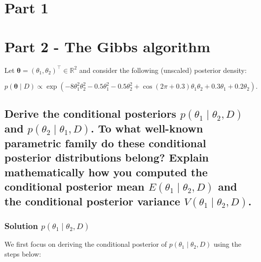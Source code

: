 \documentclass[12pt]{article}
\begin{document}
\section{Part 1}

\section{Part 2 - The Gibbs algorithm}
Let \(\boldsymbol{\theta} = (\theta_1, \theta_2)^\top \in \mathbb{R}^2\) and consider the following (unscaled) posterior density:

\[
p(\boldsymbol{\theta} \mid D) \propto \exp\left(-8\theta_1^2\theta_2^2 - 0.5\theta_1^2 - 0.5\theta_2^2 + \cos(2\pi + 0.3)\theta_1\theta_2 + 0.3\theta_1 + 0.2\theta_2 \right).
\]

\subsection{Derive the conditional posteriors \(p(\theta_1 \mid \theta_2, D)\) and \(p(\theta_2 \mid \theta_1, D)\). To what well-known parametric family do these conditional posterior distributions belong? Explain mathematically how you computed the conditional posterior mean \(E(\theta_1 \mid \theta_2, D)\) and the conditional posterior variance \(V(\theta_1 \mid \theta_2, D)\).} 
\subsubsection{Solution \(p(\theta_1 \mid \theta_2, D)\) }{\label{theta1}}
We first focus on deriving the conditional posterior of  \(p(\theta_1 \mid \theta_2, D)\) using the steps below:
\end{document}
